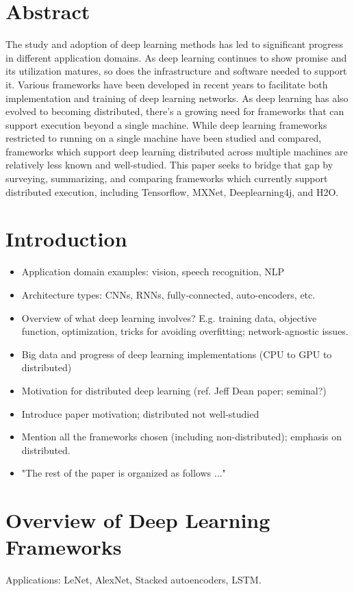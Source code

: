 \documentclass{article}
\begin{document}
\section{Abstract}
The study and adoption of deep learning methods has led to significant progress in different application domains. As deep learning continues to show promise and its utilization matures, so does the infrastructure and software needed to support it. Various frameworks have been developed in recent years to facilitate both implementation and training of deep learning networks. As deep learning has also evolved to becoming distributed, there's a growing need for frameworks that can support execution beyond a single machine. While deep learning frameworks restricted to running on a single machine have been studied and compared, frameworks which support deep learning distributed across multiple machines are relatively less known and well-studied. This paper seeks to bridge that gap by surveying, summarizing, and comparing frameworks which currently support distributed execution, including Tensorflow, MXNet, Deeplearning4j, and H2O. 

\section{Introduction}
\begin{itemize}
\item Application domain examples: vision, speech recognition, NLP
\item Architecture types:  CNNs, RNNs, fully-connected, auto-encoders, etc.
\item Overview of what deep learning involves? E.g. training data, objective function, optimization, tricks for avoiding overfitting; network-agnostic issues. 
\item Big data and progress of deep learning implementations (CPU to GPU to distributed)
\item Motivation for distributed deep learning (ref. Jeff Dean paper; seminal?)
\item Introduce paper motivation; distributed not well-studied
\item Mention all the frameworks chosen (including non-distributed); emphasis on distributed.
\item "The rest of the paper is organized as follows ..."
\end{itemize}

\section{Overview of Deep Learning Frameworks}
Applications: LeNet, AlexNet, Stacked autoencoders, LSTM.
\end{document}
